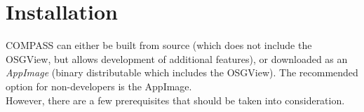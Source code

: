 \chapter{Installation}
\label{sec:installation}

COMPASS can either be built from source (which does not include the OSGView, but allows development of additional features), or downloaded as an \textit{AppImage} (binary distributable which includes the OSGView). The recommended option for non-developers is the AppImage. \\

However, there are a few prerequisites that should be taken into consideration.












